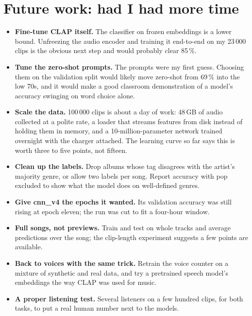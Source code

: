 \documentclass[11pt]{article}
\begin{document}
\section{Future work: had I had more time}\label{sec:future}
\begin{itemize}
  \item \textbf{Fine-tune CLAP itself.} The classifier on frozen embeddings is a lower bound. Unfreezing the audio encoder and training it end-to-end on my 23\,000 clips is the obvious next step and would probably clear 85\,\%.
  \item \textbf{Tune the zero-shot prompts.} The prompts were my first guess. Choosing them on the validation split would likely move zero-shot from 69\,\% into the low 70s, and it would make a good classroom demonstration of a model's accuracy swinging on word choice alone.
  \item \textbf{Scale the data.} 100\,000 clips is about a day of work: 48\,GB of audio collected at a polite rate, a loader that streams features from disk instead of holding them in memory, and a 10-million-parameter network trained overnight with the charger attached. The learning curve so far says this is worth three to five points, not fifteen.
  \item \textbf{Clean up the labels.} Drop albums whose tag disagrees with the artist's majority genre, or allow two labels per song. Report accuracy with pop excluded to show what the model does on well-defined genres.
  \item \textbf{Give cnn\_v4 the epochs it wanted.} Its validation accuracy was still rising at epoch eleven; the run was cut to fit a four-hour window.
  \item \textbf{Full songs, not previews.} Train and test on whole tracks and average predictions over the song; the clip-length experiment suggests a few points are available.
  \item \textbf{Back to voices with the same trick.} Retrain the voice counter on a mixture of synthetic and real data, and try a pretrained speech model's embeddings the way CLAP was used for music.
  \item \textbf{A proper listening test.} Several listeners on a few hundred clips, for both tasks, to put a real human number next to the models.
\end{itemize}
\end{document}
